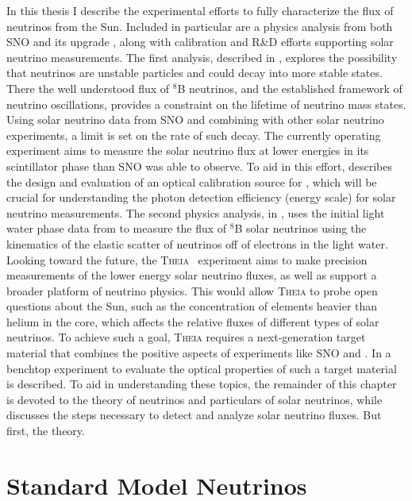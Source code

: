In this thesis I describe the experimental efforts to fully characterize the flux of neutrinos from the Sun.
Included in particular are a physics analysis from both SNO and its upgrade {\snop}, along with calibration and R\&D efforts supporting solar neutrino measurements.
The first analysis, described in , explores the possibility that neutrinos are unstable particles and could decay into more stable states.
There the well understood flux of $^8$B neutrinos, and the established framework of neutrino oscillations, provides a constraint on the lifetime of neutrino mass states.
Using solar neutrino data from SNO and combining with other solar neutrino experiments, a limit is set on the rate of such decay.
The currently operating {\snop} experiment aims to measure the solar neutrino flux at lower energies in its scintillator phase than SNO was able to observe.
To aid in this effort,  describes the design and evaluation of an optical calibration source for {\snop}, which will be crucial for understanding the photon detection efficiency (energy scale) for solar neutrino measurements.
The second physics analysis, in , uses the initial light water phase data from {\snop} to measure the flux of $^8$B solar neutrinos using the kinematics of the elastic scatter of neutrinos off of electrons in the light water.
Looking toward the future, the \textsc{Theia}~\cite{theia} experiment aims to make precision measurements of the lower energy solar neutrino fluxes, as well as support a broader platform of neutrino physics.
This would allow \textsc{Theia} to probe open questions about the Sun, such as the concentration of elements heavier than helium in the core, which affects the relative fluxes of different types of solar neutrinos. 
To achieve such a goal, \textsc{Theia} requires a next-generation target material that combines the positive aspects of experiments like SNO and {\snop}. 
In  a benchtop experiment to evaluate the optical properties of such a target material is described.
To aid in understanding these topics, the remainder of this chapter is devoted to the theory of neutrinos and particulars of solar neutrinos, while  discusses the steps necessary to detect and analyze solar neutrino fluxes.
But first, the theory.

\section{Standard Model Neutrinos}
\label{sec:stdmodel}

